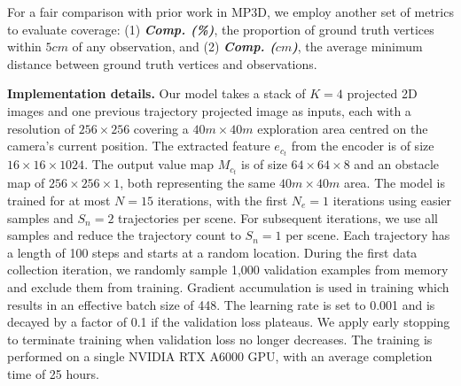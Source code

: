 For a fair comparison with prior work in MP3D, we employ another set of metrics to evaluate coverage: (1) \textbf{\textit{Comp. (\%)}}, the proportion of ground truth vertices within $5cm$ of any observation, and (2) \textbf{\textit{Comp. ($cm$)}}, the average minimum distance between ground truth vertices and observations. 



\noindent \textbf{Implementation details.}
Our model takes a stack of $K=4$ projected 2D images and one previous trajectory projected image as inputs, each with a resolution of $256 \times 256$ covering a $40m \times 40m$ exploration area centred on the camera’s current position.
The extracted feature $e_{c_t}$ from the encoder is of size $16 \times 16 \times 1024$. The output value map $M_{c_t}$ is of size $64 \times 64 \times 8$ and an obstacle map of $256 \times 256 \times 1$, both representing the same $40m \times 40m$ area.
The model is trained for at most $N=15$ iterations, with the first $N_e=1$ iterations using easier samples and $S_n=2$ trajectories per scene.
For subsequent iterations, we use all samples and reduce the trajectory count to $S_n=1$ per scene. Each trajectory has a length of 100 steps and starts at a random location.
During the first data collection iteration, we randomly sample 1,000 validation examples from memory and exclude them from training.  
Gradient accumulation is used in training which results in an effective batch size of 448. The learning rate is set to 0.001 and is decayed by a factor of 0.1 if the validation loss plateaus. We apply early stopping to terminate training when validation loss no longer decreases. 
The training is performed on a single NVIDIA RTX A6000 GPU, with an average completion time of 25 hours.



